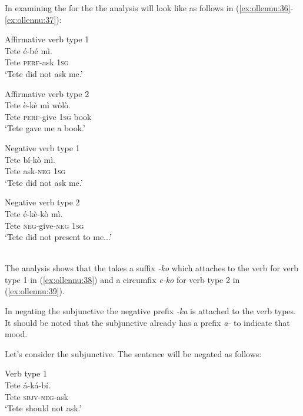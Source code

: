 \documentclass[output=paper
,newtxmath
,modfonts
,nonflat]{langsci/langscibook}
\begin{document}
In examining the  for the  the analysis will look like as follows in (\ref{ex:ollennu:36}-\ref{ex:ollennu:37}):
\begin{minipage}{.5\textwidth}
\ea Affirmative verb type 1 \\\label{ex:ollennu:36}
\gll Tete \'e-b\'e m\`i.\\
Tete \textsc{perf}-ask 1\textsc{sg}\\
\glt `Tete did not ask me.'
\z
\end{minipage}
\begin{minipage}{.5\textwidth}
\ea Affirmative verb type 2 \\ \label{ex:ollennu:37}
\gll Tete \`e-k\`e m\`i w\`ol\`o.\\
Tete \textsc{perf}-give 1\textsc{sg} book\\
\glt `Tete gave me a book.'
\z
\end{minipage}
\begin{minipage}{.5\textwidth}
\ea Negative verb type 1 \\ \label{ex:ollennu:38}
\gll Tete b\'i-k\`o m\`i.\\
Tete ask-\textsc{neg} 1\textsc{sg}\\
\glt `Tete did not ask me.'
\z
\end{minipage}
\begin{minipage}{.5\textwidth}
\ea Negative verb type 2 \\  \label{ex:ollennu:39}
 \gll Tete \'e-k\`e-k\`o m\`i.\\
Tete \textsc{neg}-give-\textsc{neg} 1\textsc{sg}\\
\glt `Tete did not present to me...'
\z
\end{minipage}\\
The analysis shows that the  takes a suffix \textit{-ko} which attaches to the verb for verb type 1 in (\ref{ex:ollennu:38}) and a circumfix \textit{e-ko} for verb type 2 in (\ref{ex:ollennu:39}).

In negating the subjunctive the negative prefix \textit{-ka} is attached to the verb types. It should be noted that the subjunctive already has a prefix \textit{a-} to indicate that mood.

Let’s consider the subjunctive. The sentence will be negated as follows:\\
\begin{minipage}{.5\textwidth}


\ea  Verb type 1 \\\label{ex:ollennu:40}
\gll Tete \'a-k\'a-b\'i.\\
Tete \textsc{sbjv}-\textsc{neg}-ask\\
\glt `Tete should not ask.'
\z
\end{minipage}
\end{document}
